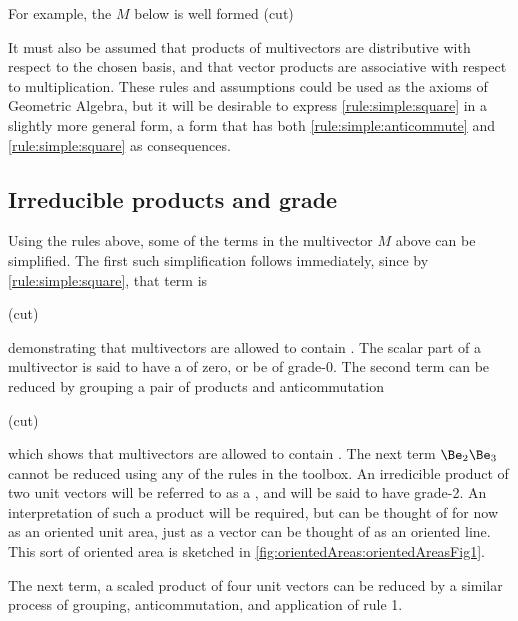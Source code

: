 %
%
For example, the  \( M \) below is well formed
(cut)

It must also be assumed that products of multivectors are distributive with respect to the chosen basis, and that vector products are associative with respect to multiplication.
These rules and assumptions could be used as the axioms of Geometric Algebra, but it will be desirable to express \ref{rule:simple:square} in a slightly more general form, a form that has both \ref{rule:simple:anticommute} and \ref{rule:simple:square} as consequences.

\subsection{Irreducible products and grade}

Using the rules above, some of the terms in the multivector \( M \) above can be simplified.
The first such simplification follows immediately, since by \ref{rule:simple:square}, that term is

(cut)

demonstrating that multivectors are allowed to contain .
The scalar part of a multivector is said to have a  of zero, or be of grade-0.
The second term can be reduced by grouping a pair of products and anticommutation

(cut)

which shows that multivectors are allowed to contain .
The next term \( \Be_2 \Be_3 \) cannot be reduced using any of the rules in the toolbox.
An irredicible product of two unit vectors will be referred to as a , and will be said to have grade-2.
An interpretation of such a product will be required, but can be thought of for now as an oriented unit area, just as a vector can be thought of as an oriented line.
This sort of oriented area is sketched in
\cref{fig:orientedAreas:orientedAreasFig1}.


The next term, a scaled product of four unit vectors can be reduced by a similar process of grouping, anticommutation, and application of rule 1.

